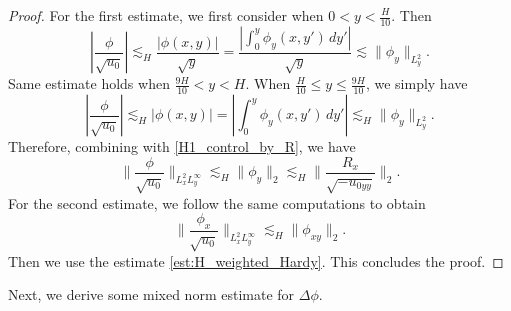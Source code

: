\documentclass[reqno, 11pt]{amsart}
\theoremstyle{plain}
\theoremstyle{definition}
\theoremstyle{remark}
\numberwithin{equation}{section}
\begin{document}
\begin{proof}
For the first estimate, we first consider when $0 < y < \frac{H}{10}$. Then
$$
\left|\frac{\phi}{\sqrt{u_0}} \right| \lesssim_H \frac{|\phi(x,y)|}{\sqrt{y}} = \frac{\left| \int_0^y \phi_{y}(x,y') \, dy'\right|}{\sqrt{y}} \lesssim \|\phi_{y}\|_{L^2_y}.
$$
Same estimate holds when $\frac{9H}{10} < y < H$. When $\frac{H}{10} \le y \le \frac{9H}{10}$, we simply have
$$
\left|\frac{\phi}{\sqrt{u_0}} \right| \lesssim_H |\phi(x,y)| = \left| \int_0^y \phi_{y}(x,y') \, dy'\right| \lesssim_H \|\phi_{y}\|_{L^2_y}.
$$
Therefore, combining with \eqref{H1_control_by_R}, we have
$$
\| \frac{\phi}{\sqrt{u_0}}\|_{L^2_x L^\infty_y} \lesssim_H \| \phi_y \|_2 \lesssim_H   \|\frac{R_x}{\sqrt{-u_{0yy}}}\|_2.
$$
For the second estimate, we follow the same computations to obtain
$$
\| \frac{\phi_x}{\sqrt{u_0}}\|_{L^2_x L^\infty_y} \lesssim_H \|\phi_{xy}\|_2.
$$
Then we use the estimate \eqref{est:H_weighted_Hardy}. This concludes the proof.
\end{proof}

Next, we derive some mixed norm estimate for $\Delta \phi$.
\end{document}
